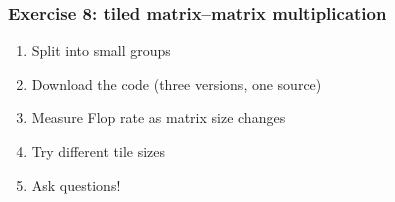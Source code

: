 \documentclass[dvipsnames,presentation,aspectratio=169,14pt]{beamer}
\begin{document}
\begin{frame}
  \frametitle{Exercise 8: tiled matrix--matrix multiplication}
  \begin{enumerate}[itemsep=8pt]
  \item Split into small groups
  \item Download the code (three versions, one source)
  \item Measure Flop rate as matrix size changes
  \item Try different tile sizes
  \item Ask questions!
  \end{enumerate}
\end{frame}
\end{document}
